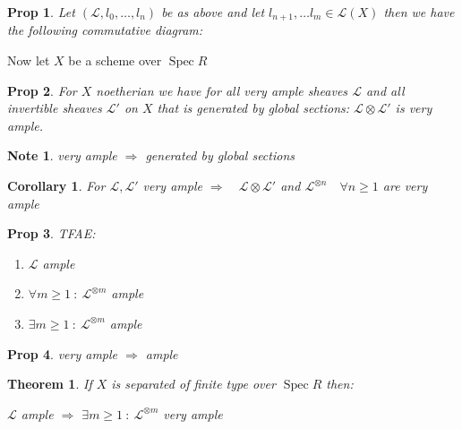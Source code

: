 \documentclass[a4paper, 12pt]{article}
\newcommand{\ca}[1]{\mathcal{#1}}
\newtheorem*{prop}{Prop}
\newtheorem*{thm}{Theorem}
\newtheorem*{note}{Note}
\newtheorem*{cor}{Corollary}
\DeclareMathOperator{\spec}{Spec}
\begin{document}
	\begin{prop}
		
		Let $ (\ca{L}, l_0, \dots , l_n) $ be as above and let $ l_{n+1} , \dots l_m \in \ca{L}(X)$
		then we have the following commutative diagram:
		
		
		
	\end{prop}
	
	Now let $ X $ be a scheme over $ \spec R $
	
	\begin{prop}
		For $ X $ noetherian we have for all very ample sheaves $ \ca{L} $ and all invertible sheaves $ \ca{L'} $ on $ X $ that is generated by global sections:  $ \ca{L} \otimes \ca{L'} $ is very ample.
	\end{prop}
	
	\begin{note}
		very ample $ \Rightarrow $ generated by global sections
	\end{note}
	
	\begin{cor}
		For $ \ca{L}, \ca{L'} $ very ample $ \Rightarrow \quad \ca{L} \otimes \ca{L'} $ and $ \ca{L}^{\otimes n} \quad \forall n \geq 1 $ are very ample 
	\end{cor}
	
	\begin{prop}
		TFAE:
		
		\begin{enumerate}
			\item $ \ca{L} $ ample
			\item $ \forall m \geq 1 \: : \: \ca{L}^{\otimes m} $ ample
			\item $ \exists m\geq 1 \: : \: \ca{L}^{\otimes m} $ ample
		\end{enumerate}
	\end{prop}
	
	\begin{prop}
		very ample $ \Rightarrow $ ample
	\end{prop}
	
	\begin{thm}
		If $ X $ is separated of finite type over $ \spec R $ then:
		
		$ \ca{L} $ ample $ \Rightarrow $  $ \exists m \geq 1 \: : \: \ca{L}^{\otimes m} $ very ample
	\end{thm}
	
\end{document}
